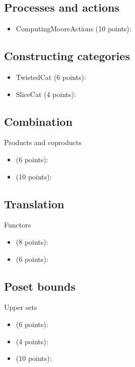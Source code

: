 \subsection{Processes and actions}
\begin{itemize}
    \item ComputingMooreActions (10 points): 
\end{itemize}

\subsection{Constructing categories}
\begin{itemize}
    \item TwistedCat (6 points): 
    \item SliceCat (4 points): 
\end{itemize}

\subsection{Combination}

Products and coproducts
\begin{itemize}
    \item {} (6 points): 
    \item {} (10 points): 
\end{itemize}

\subsection{Translation}

Functors
\begin{itemize}
    \item {} (8 points): 
    \item {} (6 points): 
\end{itemize}

\subsection{Poset bounds}
Upper sets
\begin{itemize}
    \item {} (6 points): 
    \item {} (4 points): 
    \item {} (10 points): 
\end{itemize}

